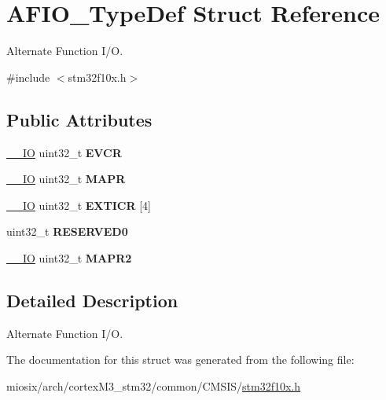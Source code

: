 \hypertarget{struct_a_f_i_o___type_def}{\section{A\-F\-I\-O\-\_\-\-Type\-Def Struct Reference}
\label{struct_a_f_i_o___type_def}
}


Alternate Function I/\-O.  




{\ttfamily \#include $<$stm32f10x.\-h$>$}

\subsection*{Public Attributes}
\begin{DoxyCompactItemize}
\item 
\hypertarget{struct_a_f_i_o___type_def_a377d5227cd20950e4489cd04df16500f}{\hyperlink{group___c_m_s_i_s__core__definitions_gaec43007d9998a0a0e01faede4133d6be}{\-\_\-\-\_\-\-I\-O} uint32\-\_\-t {\bfseries E\-V\-C\-R}}\label{struct_a_f_i_o___type_def_a377d5227cd20950e4489cd04df16500f}

\item 
\hypertarget{struct_a_f_i_o___type_def_a2b44ba1a427df7d8c0b254f869b9b463}{\hyperlink{group___c_m_s_i_s__core__definitions_gaec43007d9998a0a0e01faede4133d6be}{\-\_\-\-\_\-\-I\-O} uint32\-\_\-t {\bfseries M\-A\-P\-R}}\label{struct_a_f_i_o___type_def_a2b44ba1a427df7d8c0b254f869b9b463}

\item 
\hypertarget{struct_a_f_i_o___type_def_a5f590aa12271be60c2f61b0a6d2b8772}{\hyperlink{group___c_m_s_i_s__core__definitions_gaec43007d9998a0a0e01faede4133d6be}{\-\_\-\-\_\-\-I\-O} uint32\-\_\-t {\bfseries E\-X\-T\-I\-C\-R} \mbox{[}4\mbox{]}}\label{struct_a_f_i_o___type_def_a5f590aa12271be60c2f61b0a6d2b8772}

\item 
\hypertarget{struct_a_f_i_o___type_def_a6cf52816787797115664f0c8167a92b9}{uint32\-\_\-t {\bfseries R\-E\-S\-E\-R\-V\-E\-D0}}\label{struct_a_f_i_o___type_def_a6cf52816787797115664f0c8167a92b9}

\item 
\hypertarget{struct_a_f_i_o___type_def_a4420b9fe25158ac2e5e32f6ad9d1b6ca}{\hyperlink{group___c_m_s_i_s__core__definitions_gaec43007d9998a0a0e01faede4133d6be}{\-\_\-\-\_\-\-I\-O} uint32\-\_\-t {\bfseries M\-A\-P\-R2}}\label{struct_a_f_i_o___type_def_a4420b9fe25158ac2e5e32f6ad9d1b6ca}

\end{DoxyCompactItemize}


\subsection{Detailed Description}
Alternate Function I/\-O. 

The documentation for this struct was generated from the following file\-:\begin{DoxyCompactItemize}
\item 
miosix/arch/cortex\-M3\-\_\-stm32/common/\-C\-M\-S\-I\-S/\hyperlink{stm32f10x_8h}{stm32f10x.\-h}\end{DoxyCompactItemize}

